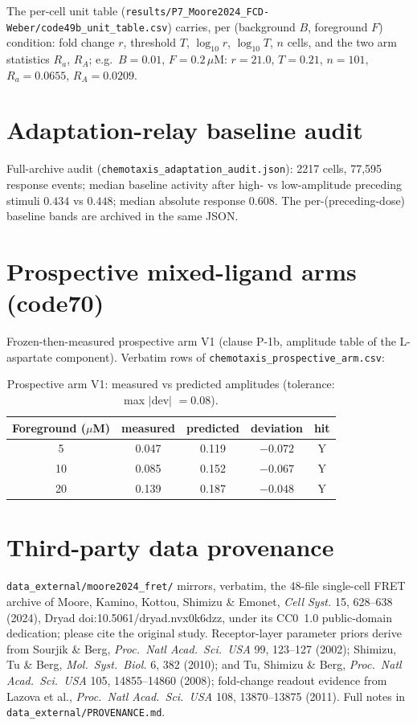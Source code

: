 \documentclass[11pt]{article}
\begin{document}
The per-cell unit table
(\texttt{results/P7\_Moore2024\_FCD-Weber/code49b\_unit\_table.csv}) carries,
per (background $B$, foreground $F$) condition: fold change $r$, threshold
$T$, $\log_{10} r$, $\log_{10} T$, $n$ cells, and the two arm statistics
$R_a$, $R_A$; e.g.\ $B{=}0.01$, $F{=}0.2\,\mu$M: $r=21.0$, $T=0.21$,
$n=101$, $R_a=0.0655$, $R_A=0.0209$.

\section{Adaptation-relay baseline audit}

Full-archive audit (\texttt{chemotaxis\_adaptation\_audit.json}):
2217 cells, 77{,}595 response events; median baseline activity after
high- vs low-amplitude preceding stimuli $0.434$ vs $0.448$; median
absolute response $0.608$. The per-(preceding-dose) baseline bands are
archived in the same JSON.

\section{Prospective mixed-ligand arms (code70)}

Frozen-then-measured prospective arm V1 (clause P-1b, amplitude table of
the L-aspartate component). Verbatim rows of
\texttt{chemotaxis\_prospective\_arm.csv}:

\begin{table}[h]
\centering\small
\caption{Prospective arm V1: measured vs predicted amplitudes
(tolerance: max $|$dev$|$ $= 0.08$).}
\label{tab:p70}
\begin{tabular}{ccccc}
\toprule
Foreground ($\mu$M) & measured & predicted & deviation & hit \\
\midrule
5  & 0.047 & 0.119 & $-0.072$ & Y \\
10 & 0.085 & 0.152 & $-0.067$ & Y \\
20 & 0.139 & 0.187 & $-0.048$ & Y \\
\bottomrule
\end{tabular}
\end{table}

\section{Third-party data provenance}

\texttt{data\_external/moore2024\_fret/} mirrors, verbatim, the 48-file
single-cell FRET archive of Moore, Kamino, Kottou, Shimizu \& Emonet,
\textit{Cell Syst.} 15, 628--638 (2024), Dryad
doi:10.5061/dryad.nvx0k6dzz, under its CC0~1.0 public-domain dedication;
please cite the original study. Receptor-layer parameter priors derive
from Sourjik \& Berg, \textit{Proc.\ Natl Acad.\ Sci.\ USA} 99,
123--127 (2002); Shimizu, Tu \& Berg, \textit{Mol.\ Syst.\ Biol.} 6,
382 (2010); and Tu, Shimizu \& Berg, \textit{Proc.\ Natl Acad.\ Sci.\
USA} 105, 14855--14860 (2008); fold-change readout evidence from Lazova
et al., \textit{Proc.\ Natl Acad.\ Sci.\ USA} 108, 13870--13875 (2011).
Full notes in \texttt{data\_external/PROVENANCE.md}.
\end{document}
